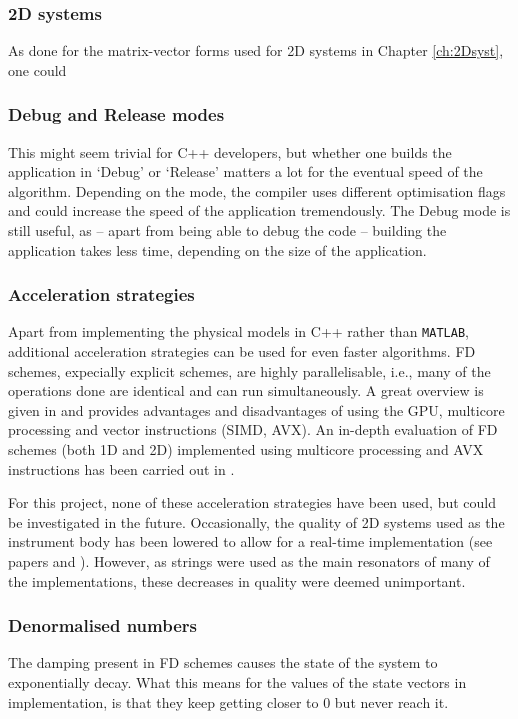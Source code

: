 \subsubsection{2D systems}
As done for the matrix-vector forms used for 2D systems in Chapter \ref{ch:2Dsyst}, one could

\subsubsection{Debug and Release modes}
This might seem trivial for C++ developers, but whether one builds the application in `Debug' or `Release' matters a lot for the eventual speed of the algorithm. Depending on the mode, the compiler uses different optimisation flags and could increase the speed of the application tremendously. The Debug mode is still useful, as -- apart from being able to debug the code -- building the application takes less time, depending on the size of the application.

\subsubsection{Acceleration strategies}
Apart from implementing the physical models in C++ rather than \texttt{MATLAB}, additional acceleration strategies can be used for even faster algorithms. FD schemes, expecially explicit schemes, are highly parallelisable, i.e., many of the operations done are identical and can run simultaneously. A great overview is given in \cite{Bilbao2019CMJb} and provides advantages and disadvantages of using the GPU, multicore processing and vector instructions (SIMD, AVX). An in-depth evaluation of FD schemes (both 1D and 2D) implemented using multicore processing and AVX instructions has been carried out   in \cite{Webb2015}.

For this project, none of these acceleration strategies have been used, but could be investigated in the future. Occasionally, the quality of 2D systems used as the instrument body has been lowered to allow for a real-time implementation (see papers \citeP[A] and \citeP[D]). However, as strings were used as the main resonators of many of the implementations, these decreases in quality were deemed unimportant.

\subsubsection{Denormalised numbers}
The damping present in FD schemes causes the state of the system to exponentially decay. What this means for the values of the state vectors in implementation, is that they keep getting closer to $0$ but never reach it. 

